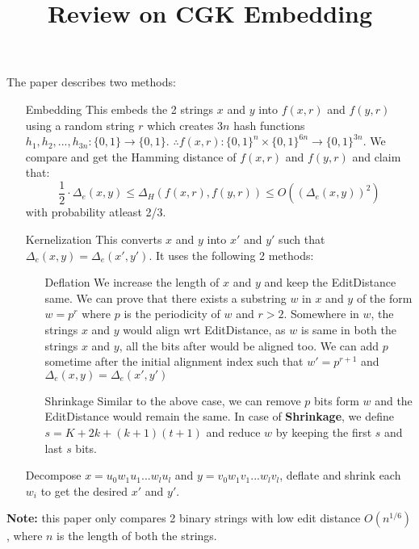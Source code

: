 \documentclass{article}
\title{Review on CGK Embedding}
\author{}
\date{}
\begin{document}
\maketitle

\noindent 
The paper describes two methods: 

\begin{enumerate}
    \item [Embedding] This embeds the 2 strings $x$ and $y$ into $f(x,r)$ and 
    $f(y,r)$ using a random string $r$ which creates $3n$ hash functions 
    $h_1,h_2,...,h_{3n}: \{0,1\} \rightarrow \{0,1\}$.
    $\therefore f(x,r): \{0,1\}^n \times \{0,1\}^{6n} \rightarrow \{0,1\}^{3n}$.
    We compare and get the Hamming distance of $f(x,r)$ and $f(y,r)$ and claim
    that:
    $$\frac{1}{2}\cdot \Delta_e(x,y) \leq \Delta_H(f(x,r),f(y,r)) \leq
    O((\Delta_e(x,y))^2)$$
    with probability atleast 2/3.

    \item [Kernelization] This converts $x$ and $y$ into $x'$ and $y'$ such 
    that $\Delta_e(x,y)=\Delta_e(x',y')$. It uses the following 2 methods:
    \begin{enumerate}
        \item [Deflation] We increase the length of $x$ and $y$ and keep the 
        EditDistance same. We can prove that there exists a substring $w$ 
        in $x$ and $y$ of the form $w=p^r$ where $p$ is the periodicity of $w$
        and $r>2$. Somewhere in $w$, the strings $x$ and $y$ would align wrt
        EditDistance, as $w$ is same in both the strings $x$ and $y$, all the 
        bits after would be aligned too. We can add $p$ sometime after the initial 
        alignment index such that $w'=p^{r+1}$ and $\Delta_e(x,y)=\Delta_e(x',y')$

        \item [Shrinkage] Similar to the above case, we can remove $p$ bits form
        $w$ and the EditDistance would remain the same. In case of 
        \textbf{Shrinkage}, we define $s=K+2k+(k+1)(t+1)$ and reduce $w$ by
        keeping the first $s$ and last $s$ bits.
    \end{enumerate}
    Decompose $x=u_0w_1u_1...w_lu_l$ and $y=v_0w_1v_1...w_lv_l$, deflate and 
    shrink each $w_i$ to get the desired $x'$ and $y'$.
\end{enumerate}

\noindent
\textbf{Note:} this paper only compares 2 binary strings with low edit distance
$O(n^{1/6})$, where $n$ is the length of both the strings.
\end{document}

